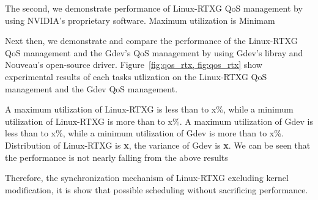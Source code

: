 The second, we demonstrate performance of Linux-RTXG QoS management by using NVIDIA's proprietary software.
Maximum utilization is Minimam 


Next then, we demonstrate and compare the performance of the Linux-RTXG QoS management and the Gdev's QoS management by using Gdev's libray and Nouveau's open-source driver.
Figure~\ref{fig:qos_rtx, fig:qos_rtx} show experimental results of each tasks utlization on the Linux-RTXG QoS management and the Gdev QoS management.

A maximum utilization of Linux-RTXG is less than to x\%, while a minimum utilization of Linux-RTXG is more than to x\%.
A maximum utilization of Gdev is less than to x\%, while a minimum utilization of Gdev is more than to x\%.
Distribution of Linux-RTXG is \textbf{x}, the variance of Gdev is \textbf{x}.
We can be seen that the performance is not nearly falling from the above results

Therefore, the synchronization mechanism of Linux-RTXG excluding kernel modification,
it is show that possible scheduling without sacrificing performance.









